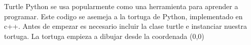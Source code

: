 Turtle Python se usa popularmente como una herramienta para aprender a programar. Este codigo se asemeja a la tortuga de Python, implementado en c++. Antes de empezar es necesario incluir la clase turtle e instanciar nuestra tortuga. La tortuga empieza a dibujar desde la coordenada (0,0) 